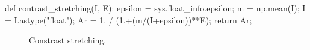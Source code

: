 \begin{python}
def contrast_stretching(I, E):
    epsilon = sys.float_info.epsilon;
    m = np.mean(I);
    I = I.astype("float");
    Ar = 1. / (1.+(m/(I+epsilon))**E);
    return Ar;
\end{python}


\begin{figure}[htbp]
 \centering\caption{Constrast stretching.}%
  \hfill
 
  \hfill
 \vspace*{-5pt}%
 \label{fig:enhancement:python:stretching}%
\end{figure}
 \vspace*{-6mm}
